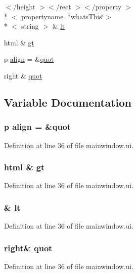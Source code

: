 \begin{DoxyCompactItemize}
$<$/height $>$$<$/rect $>$$<$/property $>$\\*
$<$ propertyname=\char`\"{}whats\-This\char`\"{}$>$\\*
$<$ string $>$ \& \hyperlink{mainwindow_8ui_a857c8c8ca640fb2283d751a715bd1ee9}{lt}
\item 
html \& \hyperlink{mainwindow_8ui_acc2b3ab3dd842d17613f7a6cbf7f275d}{gt}
\item 
p \hyperlink{mainwindow_8ui_ab28bdaf6ad2b6aba883d92e474f75867}{align} = \&\hyperlink{mainwindow_8ui_a6ac641f7a2ac50c1fa0b167e88309133}{quot}
\item 
right \& \hyperlink{mainwindow_8ui_a6ac641f7a2ac50c1fa0b167e88309133}{quot}
\end{DoxyCompactItemize}


\subsection{Variable Documentation}
\hypertarget{mainwindow_8ui_ab28bdaf6ad2b6aba883d92e474f75867}{
\subsubsection[{align}]{\setlength{\rightskip}{0pt plus 5cm}p align = \&{\bf quot}}}\label{mainwindow_8ui_ab28bdaf6ad2b6aba883d92e474f75867}


Definition at line 36 of file mainwindow.\-ui.

\hypertarget{mainwindow_8ui_acc2b3ab3dd842d17613f7a6cbf7f275d}{
\subsubsection[{gt}]{\setlength{\rightskip}{0pt plus 5cm}html \& gt}}\label{mainwindow_8ui_acc2b3ab3dd842d17613f7a6cbf7f275d}


Definition at line 36 of file mainwindow.\-ui.

\hypertarget{mainwindow_8ui_a857c8c8ca640fb2283d751a715bd1ee9}{
\subsubsection[{lt}]{\setlength{\rightskip}{0pt plus 5cm}\& lt}}\label{mainwindow_8ui_a857c8c8ca640fb2283d751a715bd1ee9}


Definition at line 36 of file mainwindow.\-ui.

\hypertarget{mainwindow_8ui_a6ac641f7a2ac50c1fa0b167e88309133}{
\subsubsection[{quot}]{\setlength{\rightskip}{0pt plus 5cm}right\& quot}}\label{mainwindow_8ui_a6ac641f7a2ac50c1fa0b167e88309133}


Definition at line 36 of file mainwindow.\-ui.

